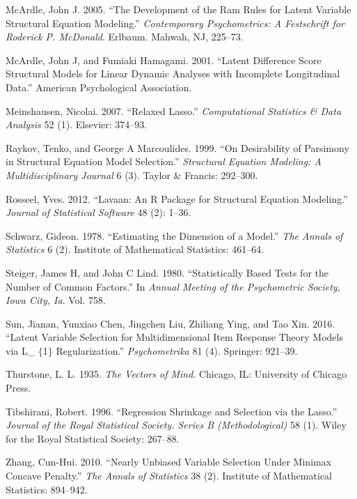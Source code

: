 \documentclass[article]{jss}
\begin{document}
\hypertarget{ref-mcardle2005}{}
McArdle, John J. 2005. ``The Development of the Ram Rules for Latent
Variable Structural Equation Modeling.'' \emph{Contemporary
Psychometrics: A Festschrift for Roderick P. McDonald}. Erlbaum. Mahwah,
NJ, 225--73.

\hypertarget{ref-mcardle2001latent}{}
McArdle, John J, and Fumiaki Hamagami. 2001. ``Latent Difference Score
Structural Models for Linear Dynamic Analyses with Incomplete
Longitudinal Data.'' American Psychological Association.

\hypertarget{ref-meinshausen2007relaxed}{}
Meinshausen, Nicolai. 2007. ``Relaxed Lasso.'' \emph{Computational
Statistics \& Data Analysis} 52 (1). Elsevier: 374--93.

\hypertarget{ref-raykov1999desirability}{}
Raykov, Tenko, and George A Marcoulides. 1999. ``On Desirability of
Parsimony in Structural Equation Model Selection.'' \emph{Structural
Equation Modeling: A Multidisciplinary Journal} 6 (3). Taylor \&
Francis: 292--300.

\hypertarget{ref-rosseel2012}{}
Rosseel, Yves. 2012. ``Lavaan: An R Package for Structural Equation
Modeling.'' \emph{Journal of Statistical Software} 48 (2): 1--36.

\hypertarget{ref-schwarz1978estimating}{}
Schwarz, Gideon. 1978. ``Estimating the Dimension of a Model.''
\emph{The Annals of Statistics} 6 (2). Institute of Mathematical
Statistics: 461--64.

\hypertarget{ref-steiger1980}{}
Steiger, James H, and John C Lind. 1980. ``Statistically Based Tests for
the Number of Common Factors.'' In \emph{Annual Meeting of the
Psychometric Society, Iowa City, Ia}. Vol. 758.

\hypertarget{ref-sun2016latent}{}
Sun, Jianan, Yunxiao Chen, Jingchen Liu, Zhiliang Ying, and Tao Xin.
2016. ``Latent Variable Selection for Multidimensional Item Response
Theory Models via L\_ \(\{\)1\(\}\) Regularization.''
\emph{Psychometrika} 81 (4). Springer: 921--39.

\hypertarget{ref-thurstone1937}{}
Thurstone, L. L. 1935. \emph{The Vectors of Mind}. Chicago, IL:
University of Chicago Press.

\hypertarget{ref-Tibshirani1996}{}
Tibshirani, Robert. 1996. ``Regression Shrinkage and Selection via the
Lasso.'' \emph{Journal of the Royal Statistical Society. Series B
(Methodological)} 58 (1). Wiley for the Royal Statistical Society:
267--88.

\hypertarget{ref-zhang2010nearly}{}
Zhang, Cun-Hui. 2010. ``Nearly Unbiased Variable Selection Under Minimax
Concave Penalty.'' \emph{The Annals of Statistics} 38 (2). Institute of
Mathematical Statistics: 894--942.
\end{document}
